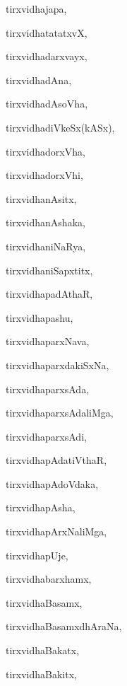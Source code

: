 \begin{multicols}{2}
{tirxvidhajapa}, \pageref{tirxvidhajapa}

{tirxvidhatatatxvX}, \pageref{tirxvidhatatatxvX}

{tirxvidhadarxvayx}, \pageref{tirxvidhadarxvayx}

{tirxvidhadAna}, \pageref{tirxvidhadAna}

{tirxvidhadAsoVha}, \pageref{tirxvidhadAsoVha}

{tirxvidhadiVkeSx(kASx)}, \pageref{tirxvidhadiVkeSxkASx}

{tirxvidhadorxVha}, \pageref{tirxvidhadorxVha}

{tirxvidhadorxVhi}, \pageref{tirxvidhadorxVhi}

{tirxvidhanAsitx}, \pageref{tirxvidhanAsitx}

{tirxvidhanAshaka}, \pageref{tirxvidhanAshaka}

{tirxvidhaniNaRya}, \pageref{tirxvidhaniNaRya}

{tirxvidhaniSapxtitx}, \pageref{tirxvidhaniSapxtitx}

{tirxvidhapadAthaR}, \pageref{tirxvidhapadAthaR}

{tirxvidhapashu}, \pageref{tirxvidhapashu}

{tirxvidhaparxNava}, \pageref{tirxvidhaparxNava}

{tirxvidhaparxdakiSxNa}, \pageref{tirxvidhaparxdakiSxNa}

{tirxvidhaparxsAda}, \pageref{tirxvidhaparxsAda}

{tirxvidhaparxsAdaliMga}, \pageref{tirxvidhaparxsAdaliMga}

{tirxvidhaparxsAdi}, \pageref{tirxvidhaparxsAdi}

{tirxvidhapAdatiVthaR}, \pageref{tirxvidhapAdatiVthaR}

{tirxvidhapAdoVdaka}, \pageref{tirxvidhapAdoVdaka}

{tirxvidhapAsha}, \pageref{tirxvidhapAsha}

{tirxvidhapArxNaliMga}, \pageref{tirxvidhapArxNaliMga}

{tirxvidhapUje}, \pageref{tirxvidhapUje}

{tirxvidhabarxhamx}, \pageref{tirxvidhabarxhamx}

{tirxvidhaBasamx}, \pageref{tirxvidhaBasamx}

{tirxvidhaBasamxdhAraNa}, \pageref{tirxvidhaBasamxdhAraNa}

{tirxvidhaBakatx}, \pageref{tirxvidhaBakatx}

{tirxvidhaBakitx}, \pageref{tirxvidhaBakitx}


\end{multicols}
